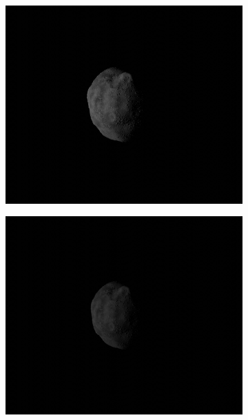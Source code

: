 \begin{figure}[htb]
    \centering
    \begin{subfigure}[b]{0.48\textwidth}
        \centering
            \includegraphics[width=\textwidth]{doc/thesis/0_figures/rendering_lighting/SssbOnly_2017-08-15T115858-281000.jpg}
            \caption{}
            \label{fig:composition_before_1}
    \end{subfigure}
    \begin{subfigure}[b]{0.48\textwidth}
        \centering
            \includegraphics[width=\textwidth]{doc/thesis/0_figures/rendering_lighting/SssbOnly_2017-08-15T115859-288000.jpg}

\end{subfigure}
\end{figure}

